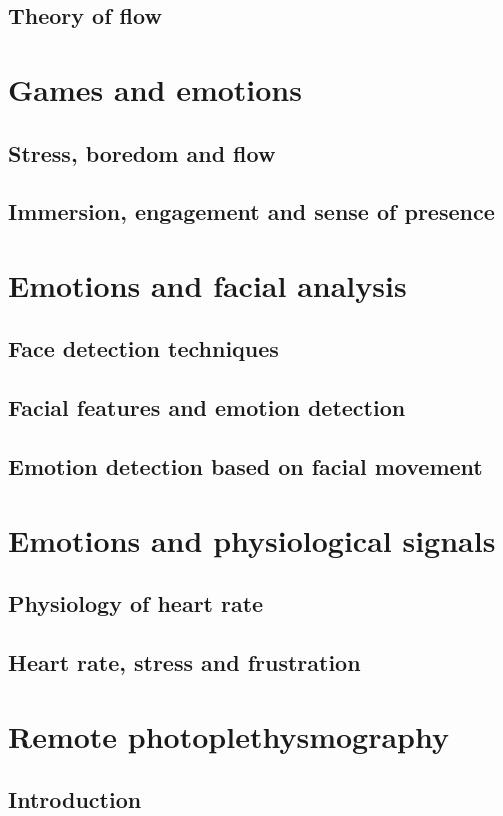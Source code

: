     \subsection{Theory of flow}
  \section{Games and emotions}
    \subsection{Stress, boredom and flow}
    \subsection{Immersion, engagement and sense of presence}
  \section{Emotions and facial analysis}
    \subsection{Face detection techniques}
    \subsection{Facial features and emotion detection}
    \subsection{Emotion detection based on facial movement}
  \section{Emotions and physiological signals}
    \subsection{Physiology of heart rate}
    \subsection{Heart rate, stress and frustration}
  \section{Remote photoplethysmography}
    \subsection{Introduction}
